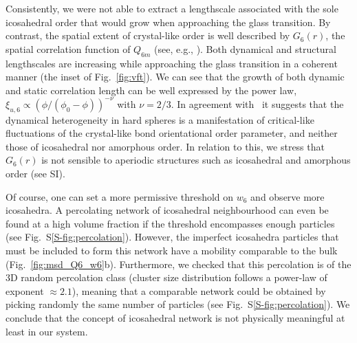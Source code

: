 Consistently, we were not able to extract a lengthscale associated with the sole icosahedral order that would grow when approaching the glass transition. By contrast, the spatial extent of crystal-like order is well described by $G_6(r)$, the spatial correlation function of $Q_{6 m}$ (see, e.g., \cite{tanaka2010critical}). Both dynamical and structural lengthscales are increasing while approaching the glass transition in a coherent manner (the inset of Fig.~\ref{fig:vft}). We can see that the growth of both dynamic and static correlation length can be well expressed by the power law,   $\xi_{u,6} \propto (\phi/(\phi_0-\phi))^{-\nu}$ with $\nu=2/3$. In agreement with~\citep{tanaka2010critical} it suggests that the dynamical heterogeneity in hard spheres is a manifestation of critical-like fluctuations of the crystal-like bond orientational order parameter, and neither those of icosahedral nor amorphous order. In relation to this, we stress that $G_6(r)$ is not sensible to aperiodic structures such as icosahedral and amorphous order (see SI). 

Of course, one can set a more permissive threshold on $w_6$ and observe more icosahedra. A percolating network of icosahedral neighbourhood can even be found at a high volume fraction if the threshold encompasses enough particles (see Fig.~S\ref{S-fig:percolation}). However, the imperfect icosahedra particles that must be included to form this network have a mobility comparable to the bulk (Fig.~\ref{fig:msd_Q6_w6}b). Furthermore, we checked that this percolation is of the 3D random percolation class (cluster size distribution follows a power-law of exponent $\approx 2.1$), meaning that a comparable network could be obtained by picking randomly the same number of particles (see Fig.~S\ref{S-fig:percolation}). We conclude that the concept of icosahedral network is not physically meaningful at least in our system.

